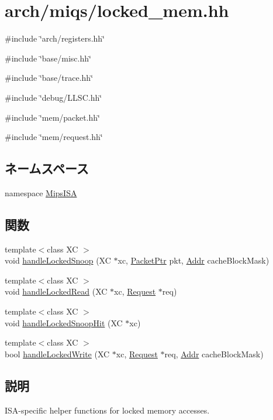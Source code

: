 \hypertarget{miqs_2locked__mem_8hh}{
\section{arch/miqs/locked\_\-mem.hh}
\label{miqs_2locked__mem_8hh}
}
{\ttfamily \#include \char`\"{}arch/registers.hh\char`\"{}}\par
{\ttfamily \#include \char`\"{}base/misc.hh\char`\"{}}\par
{\ttfamily \#include \char`\"{}base/trace.hh\char`\"{}}\par
{\ttfamily \#include \char`\"{}debug/LLSC.hh\char`\"{}}\par
{\ttfamily \#include \char`\"{}mem/packet.hh\char`\"{}}\par
{\ttfamily \#include \char`\"{}mem/request.hh\char`\"{}}\par
\subsection*{ネームスペース}
\begin{DoxyCompactItemize}
\item 
namespace \hyperlink{namespaceMipsISA}{MipsISA}
\end{DoxyCompactItemize}
\subsection*{関数}
\begin{DoxyCompactItemize}
\item 
{\footnotesize template$<$class XC $>$ }\\void \hyperlink{namespaceMipsISA_a5f9bf68eab13cc8599dadd035bb3a45e}{handleLockedSnoop} (XC $\ast$xc, \hyperlink{classPacket}{PacketPtr} pkt, \hyperlink{base_2types_8hh_af1bb03d6a4ee096394a6749f0a169232}{Addr} cacheBlockMask)
\item 
{\footnotesize template$<$class XC $>$ }\\void \hyperlink{namespaceMipsISA_aa7cc172c439c44fb54dc4c9ba7d90c3d}{handleLockedRead} (XC $\ast$xc, \hyperlink{classRequest}{Request} $\ast$req)
\item 
{\footnotesize template$<$class XC $>$ }\\void \hyperlink{namespaceMipsISA_a6212c59e93e2406923f9f1f3c6aabc9f}{handleLockedSnoopHit} (XC $\ast$xc)
\item 
{\footnotesize template$<$class XC $>$ }\\bool \hyperlink{namespaceMipsISA_afc30934f8d6d2afd2ff8f255ab6653ba}{handleLockedWrite} (XC $\ast$xc, \hyperlink{classRequest}{Request} $\ast$req, \hyperlink{base_2types_8hh_af1bb03d6a4ee096394a6749f0a169232}{Addr} cacheBlockMask)
\end{DoxyCompactItemize}


\subsection{説明}
ISA-\/specific helper functions for locked memory accesses. 